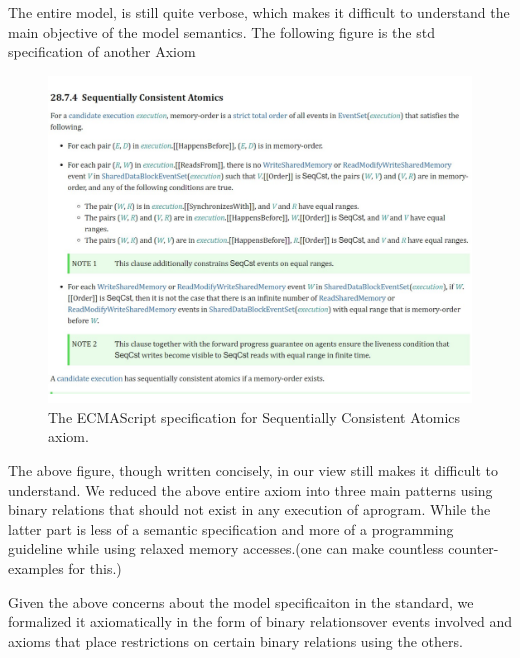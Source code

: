     The entire model, is still quite verbose, which makes it difficult to understand the main objective of the model semantics. 
    The following figure is the std specification of another Axiom 
    \begin{figure}[H]
        \centering 
        \includegraphics[scale=0.6]{4.ECMAScriptMemoryModel/ECMAScriptStdSeqCnsAt.pdf}
        \caption{The ECMAScript specification for Sequentially Consistent Atomics axiom.}
    \end{figure}
    The above figure, though written concisely, in our view still makes it difficult to understand. 
    We reduced the above entire axiom into three main patterns using binary relations that should not exist in any execution of aprogram. 
    While the latter part is less of a semantic specification and more of a programming guideline while using relaxed memory accesses.(one can make countless counter-examples for this.) 

Given the above concerns about the model specificaiton in the standard, we formalized it axiomatically in the form of binary relationsover events involved and axioms that place restrictions on certain binary relations using the others. 

